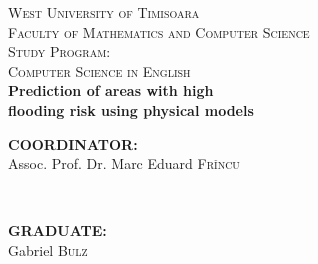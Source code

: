 \documentclass[12pt, a4paper]{report}
\begin{document}
\begin{titlepage}

\newcommand{\HRule}{\rule{\linewidth}{0.5mm}} %

\center %


\vspace{3cm}


\textsc{\LARGE West University of  Timisoara}\\[0.5cm] %
\textsc{\Large Faculty of Mathematics and Computer Science}\\[0.5cm] %
\textsc{\large Study Program: \\Computer Science in English}\\[6cm] %




{\Huge \bfseries Prediction of areas with high  }
\\[0.4cm]
{\Huge \bf flooding risk using physical models}\\[5cm] %
 


\begin{minipage}{0.4\textwidth}
\begin{flushleft} \large
\textbf{COORDINATOR:}\\
Assoc. Prof. Dr. Marc Eduard \textsc{Fr\^incu} %
\end{flushleft}
\end{minipage}
~
\begin{minipage}{0.4\textwidth}
\begin{flushright} \large
\textbf{GRADUATE:} \\
Gabriel \textsc{Bulz} %
\end{flushright}
\end{minipage}\\[1cm]


\end{titlepage}
\end{document}

